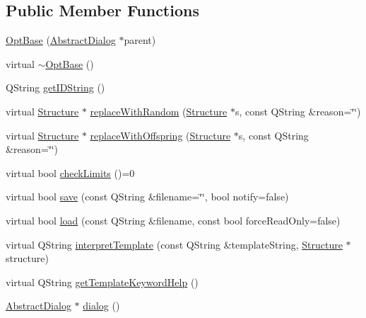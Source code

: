 \subsection*{Public Member Functions}
\begin{DoxyCompactItemize}
\item 
\hyperlink{classGlobalSearch_1_1OptBase_a673110fb0bfe11da3f9f7811744c6578}{Opt\+Base} (\hyperlink{classGlobalSearch_1_1AbstractDialog}{Abstract\+Dialog} $\ast$parent)
\item 
virtual \hyperlink{classGlobalSearch_1_1OptBase_a8b5809d4bb0f97a2bad0ffc05c161f86}{$\sim$\+Opt\+Base} ()
\item 
Q\+String \hyperlink{classGlobalSearch_1_1OptBase_ae4223191dd58c47e186bbdf07f99ef1c}{get\+I\+D\+String} ()
\item 
virtual \hyperlink{classGlobalSearch_1_1Structure}{Structure} $\ast$ \hyperlink{classGlobalSearch_1_1OptBase_a8a370fdd83d4a157bb72fb0c865e31a4}{replace\+With\+Random} (\hyperlink{classGlobalSearch_1_1Structure}{Structure} $\ast$s, const Q\+String \&reason=\char`\"{}\char`\"{})
\item 
virtual \hyperlink{classGlobalSearch_1_1Structure}{Structure} $\ast$ \hyperlink{classGlobalSearch_1_1OptBase_a95ca1cb22a947989817c7cfc952cffbd}{replace\+With\+Offspring} (\hyperlink{classGlobalSearch_1_1Structure}{Structure} $\ast$s, const Q\+String \&reason=\char`\"{}\char`\"{})
\item 
virtual bool \hyperlink{classGlobalSearch_1_1OptBase_a406ca6399df3ef7fa545f3b34f90e0a4}{check\+Limits} ()=0
\item 
virtual bool \hyperlink{classGlobalSearch_1_1OptBase_abfacbe5ffa9d69db4e27bf6db2ad62f7}{save} (const Q\+String \&filename=\char`\"{}\char`\"{}, bool notify=false)
\item 
virtual bool \hyperlink{classGlobalSearch_1_1OptBase_a1d5e689eb327ccaf4c25f64e83e5678b}{load} (const Q\+String \&filename, const bool force\+Read\+Only=false)
\item 
virtual Q\+String \hyperlink{classGlobalSearch_1_1OptBase_a238dbb50b8d7aac7a6660613397565f0}{interpret\+Template} (const Q\+String \&template\+String, \hyperlink{classGlobalSearch_1_1Structure}{Structure} $\ast$structure)
\item 
virtual Q\+String \hyperlink{classGlobalSearch_1_1OptBase_a79650b4bd0dde4580a98a89e7032be96}{get\+Template\+Keyword\+Help} ()
\item 
\hyperlink{classGlobalSearch_1_1AbstractDialog}{Abstract\+Dialog} $\ast$ \hyperlink{classGlobalSearch_1_1OptBase_a3ccbd5949beb6e1efac734da29b726b7}{dialog} ()

\end{DoxyCompactItemize}
